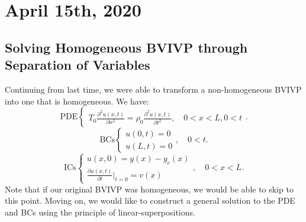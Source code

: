 \documentclass[../main/main.tex]{subfiles}
\begin{document}
\section{April 15th, 2020}
\subsection{Solving Homogeneous BVIVP through Separation of Variables}
Continuing from last time, we were able to transform a non-homogeneous BVIVP into one that is homogeneous. We have: \[
\text{PDE} \begin{cases}
	T_0 \frac{\partial ^2 u(x,t)}{\partial x^2} = \rho_0 \frac{\partial ^2 u(x,t)}{\partial t^2} ,\quad 0 < x < L , 0 < t
\end{cases}
.\] \[
\text{BCs} \begin{cases}
	u(0,t) = 0 \\ u(L,t) = 0
\end{cases}, \quad 0 < t
.\] \[
\text{ICs} \begin{cases}
u(x,0) = y(x) - y_e(x) \\ \frac{\partial u(x,t)}{\partial t} \bigg\rvert_{t=0} = v(x)
\end{cases}, \quad 0 < x < L
.\] Note that if our original BVIVP was homogeneous, we would be able to skip to this point. Moving on, we would like to construct a general solution to the PDE and BCs using the principle of linear-superpositions.
\end{document}

